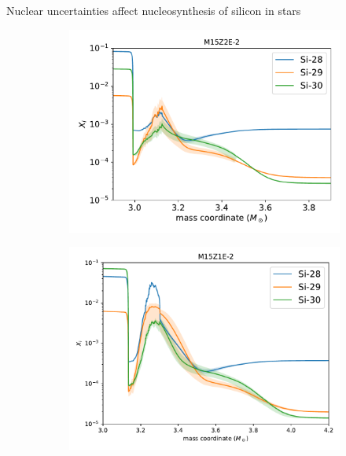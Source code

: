 \documentclass[10pt]{beamer}
\begin{document}
\begin{frame}{Nuclear uncertainties affect nucleosynthesis of silicon in stars}
        \begin{figure}
        \begin{subfigure}[b]{0.42\textwidth}
            \includegraphics[width=\textwidth]{figs/M15Z2E-2_mcresult.pdf}
        \end{subfigure}
        \begin{subfigure}[b]{0.42\textwidth}
            \includegraphics[width=\textwidth]{figs/M15Z1E-2_mcresult.pdf}
        \end{subfigure}
        

\end{figure}
\end{frame}
\end{document}

